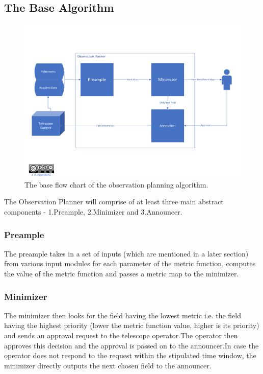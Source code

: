 \documentclass{article}
\begin{document}
\subsection{The Base Algorithm}

\begin{figure}[!ht]
\centering
\includegraphics[width=\linewidth]{Base_new.pdf}
\caption{The base flow chart of the observation planning algorithm.}
\label{fig:baseflow}
\end{figure}

The Observation Planner will comprise of at least three main abstract  components - 1.Preample, 2.Minimizer and 3.Announcer.

\subsubsection{Preample}
The preample takes in a set of inputs (which are mentioned in a later section) from various input modules for each parameter of the metric function, computes the value of the metric function and passes a metric map to the minimizer.

\subsubsection{Minimizer}
The minimizer then looks for the field having the lowest metric i.e. the field having the highest priority (lower the metric function value, higher is its priority) and sends an approval request to the telescope operator.\newline The operator then approves this decision and the approval is passed on to the announcer.\newline In case the operator does not respond to the request within the stipulated time window, the minimizer directly outputs the next chosen field to the announcer. 
\end{document}

